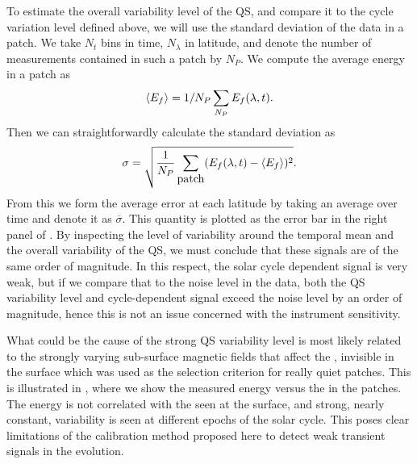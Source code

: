 \documentclass{aa}
\begin{document}
To estimate 
the overall variability level of the QS, and compare it to the cycle variation level defined above,
we will use the standard deviation of the data in a patch.
We take $N_t$ bins in time, $N_\lambda$ in latitude, and denote the number of \ef measurements contained in such a patch by $N_P$. We compute the average \fff energy in a patch as
\begin{equation}
\langle E_f \rangle=1/N_P \sum_{N_P} E_f (\lambda,t).
\end{equation}
Then we can straightforwardly calculate the standard deviation as
\begin{equation}
\sigma= \sqrt{\frac{1}{N_P}\sum_{\mbox{patch}} ( E_f(\lambda,t)
- \left<{E_f} \right>)^2}.
\end{equation}
From this we form the average error at each latitude by taking an average over time and denote it as $\overline{\sigma}$. 
This quantity is plotted as the error bar in the right panel of 
.
By inspecting the level of variability around the temporal mean and the 
overall variability of the QS, we must conclude that these signals are of the same order of magnitude. 
In this respect, the solar cycle dependent signal is very weak, but if we compare that to the noise level in the data, both the QS variability level and cycle-dependent signal exceed the noise level by an order of magnitude, hence this is not an issue concerned with the instrument sensitivity.


What could be the cause of the strong QS variability level is most likely related to the strongly varying sub-surface magnetic fields that affect the \fffns,
invisible in
the surface \brms{} which was used as the selection criterion for really quiet patches. 
This is illustrated in , where we show the measured \fff energy versus the \brms{} in the patches. The \fff energy is not correlated with the \brms{} seen at the surface, and strong, nearly constant, variability is seen at different epochs of the solar cycle. This poses clear limitations of the calibration method proposed here to detect weak transient signals in the \fff evolution.
\end{document}
